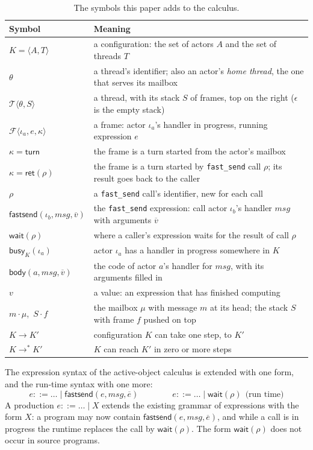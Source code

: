\documentclass[11pt]{article}
\newcommand{\rowsep}{\specialrule{0.3pt}{1.5pt}{1.5pt}}
\theoremstyle{definition}
\theoremstyle{remark}
\newcommand{\fs}{\texttt{fast\_send}}
\newcommand{\Thr}[1]{\mathcal{T}\langle #1\rangle}
\newcommand{\Frm}[1]{\mathcal{F}\langle #1\rangle}
\newcommand{\turn}{\mathsf{turn}}
\newcommand{\ret}[1]{\mathsf{ret}(#1)}
\newcommand{\wait}[1]{\mathsf{wait}(#1)}
\newcommand{\fsend}{\mathsf{fastsend}}
\newcommand{\busy}{\mathsf{busy}}
\newcommand{\body}{\mathsf{body}}
\newcommand{\red}{\longrightarrow}
\begin{document}
\begin{table}[t]
\centering
\caption{The symbols this paper adds to the calculus.}
\label{tab:oursymbols}
\small
\begin{tabular}{@{}lP{11.5cm}@{}}
\toprule
Symbol & Meaning \\
\midrule
$K = \langle A, T\rangle$ & a configuration: the set of actors $A$ and the set of threads $T$ \\ \rowsep
$\theta$ & a thread's identifier; also an actor's \emph{home thread}, the one that serves its mailbox \\ \rowsep
$\Thr{\theta, S}$ & a thread, with its stack $S$ of frames, top on the right ($\epsilon$ is the empty stack) \\ \rowsep
$\Frm{\iota_a, e, \kappa}$ & a frame: actor $\iota_a$'s handler in progress, running expression $e$ \\ \rowsep
$\kappa = \turn$ & the frame is a turn started from the actor's mailbox \\ \rowsep
$\kappa = \ret{\rho}$ & the frame is a turn started by \fs{} call $\rho$; its result goes back to the caller \\ \rowsep
$\rho$ & a \fs{} call's identifier, new for each call \\ \rowsep
$\fsend(\iota_b, msg, \overline{v})$ & the \fs{} expression: call actor $\iota_b$'s handler $msg$ with arguments $\overline{v}$ \\ \rowsep
$\wait{\rho}$ & where a caller's expression waits for the result of call $\rho$ \\ \rowsep
$\busy_K(\iota_a)$ & actor $\iota_a$ has a handler in progress somewhere in $K$ \\ \rowsep
$\body(a, msg, \overline{v})$ & the code of actor $a$'s handler for $msg$, with its arguments filled in \\ \rowsep
$v$ & a value: an expression that has finished computing \\ \rowsep
$m \cdot \mu$,\ $S \cdot f$ & the mailbox $\mu$ with message $m$ at its head; the stack $S$ with frame $f$ pushed on top \\ \rowsep
$K \red K'$ & configuration $K$ can take one step, to $K'$ \\ \rowsep
$K \red^* K'$ & $K$ can reach $K'$ in zero or more steps \\
\bottomrule
\end{tabular}
\end{table}

The expression syntax of the active-object calculus is extended with one form, and the
run-time syntax with one more:
\[
e ::= \dots \mid \fsend(e, msg, \overline{e})\qquad\qquad
e ::= \dots \mid \wait{\rho}\ \ \text{(run time)}
\]
A production $e ::= \dots \mid X$ extends the existing grammar of expressions with the
form $X$: a program may now contain $\fsend(e, msg, \overline{e})$, and while a call is
in progress the runtime replaces the call by $\wait{\rho}$. The form $\wait{\rho}$ does
not occur in source programs.
\end{document}
